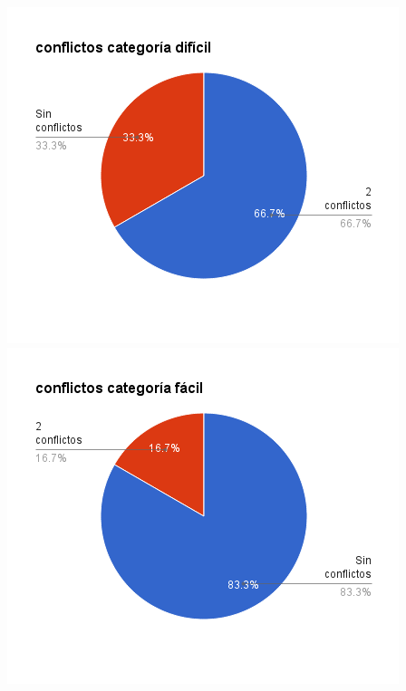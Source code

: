 \documentclass[a4paper,spanish]{article}
\begin{document}
\noindent
\begin{minipage}{0.50\textwidth}
	\includegraphics[width=\textwidth]{./graficos/conflictosDificil.png}
	\includegraphics[width=\textwidth]{./graficos/conflictosFacil.png}
	\label{G}
\end{minipage}
\end{document}
